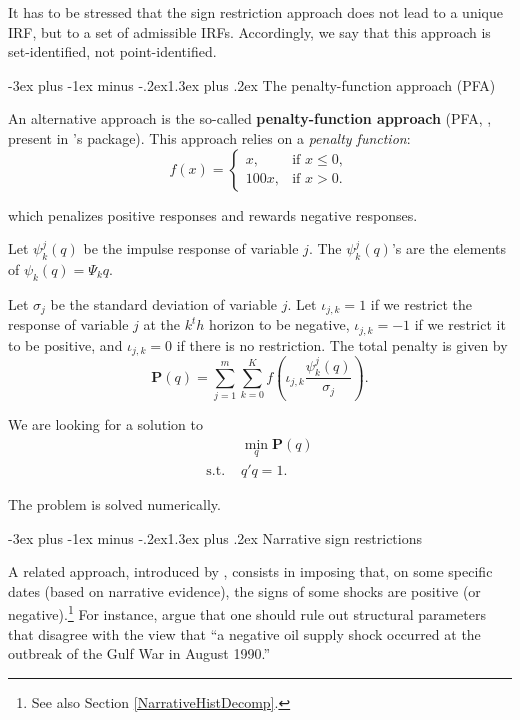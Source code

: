 \documentclass[
  11pt,
]{book}
\makeatletter
\renewcommand\section{\@startsection{section}{1}{\z@}
  {-3ex plus -1ex minus -.2ex}{1.3ex plus .2ex}
  {\normalfont\Large\bfseries\color{TextbookInk}}}
\theoremstyle{definition}
\theoremstyle{definition}
\theoremstyle{definition}
\theoremstyle{definition}
\theoremstyle{remark}
\makeatother
\begin{document}
It has to be stressed that the sign restriction approach does not lead to a unique IRF, but to a set of admissible IRFs. Accordingly, we say that this approach is set-identified, not point-identified.

\section{The penalty-function approach (PFA)}\label{the-penalty-function-approach-pfa}

An alternative approach is the so-called \textbf{penalty-function approach} (PFA, \citet{Uhlig_2005}, present in \citet{Danne_2015}'s package). This approach relies on a \emph{penalty function}:
\[
f(x)=
\begin{cases}
x, & \text{if } x \le 0,\\[6pt]
100x, & \text{if } x > 0.
\end{cases}
\]

which penalizes positive responses and rewards negative responses.

Let \(\psi_k^j(q)\) be the impulse response of variable \(j\). The \(\psi_k^j(q)\)'s are the elements of \(\psi_k(q)=\Psi_kq\).

Let \(\sigma_j\) be the standard deviation of variable \(j\). Let \(\iota_{j,k}=1\) if we restrict the response of variable \(j\) at the \(k^th\) horizon to be negative, \(\iota_{j,k}=-1\) if we restrict it to be positive, and \(\iota_{j,k}=0\) if there is no restriction. The total penalty is given by \[
\mathbf{P}(q)=\sum_{j=1}^m\sum_{k=0}^Kf\left(\iota_{j,k}\frac{\psi_k^j(q)}{\sigma_j}\right).
\]

We are looking for a solution to
\[\begin{array}{ll}
&\min_q \mathbf{P}(q)\\
\text{s.t. }&q'q=1.\end{array}\]

The problem is solved numerically.

\section{Narrative sign restrictions}\label{NarrativeSign}

A related approach, introduced by \citet{AntolinDiaz_RubioRamirez_2018}, consists in imposing that, on some specific dates (based on narrative evidence), the signs of some shocks are positive (or negative).\footnote{See also Section \ref{NarrativeHistDecomp}.} For instance, \citet{AntolinDiaz_RubioRamirez_2018} argue that one should rule out structural parameters that disagree with the view that ``a negative oil supply shock occurred at the outbreak of the Gulf War in August 1990.''
\end{document}
